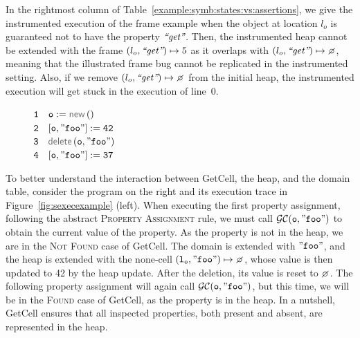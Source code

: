  
 
 In the rightmost column of Table~\ref{example:symb:states:vs:assertions}, we give the instrumented 
 execution of the frame example when
 the object at location $l_o$ is guaranteed not to have the property $\text{{\it ``get''}}$. 
 Then, the  instrumented heap cannot be extended  with 
 the frame $(l_o, \text{{\it ``get''}}) \mapsto 5$ as it overlaps with $(\loc_o, \litstring{get}) \mapsto \none$, meaning 
 that the illustrated frame bug cannot be replicated in the instrumented setting.  
 Also, if we remove $(\loc_o, \litstring{get}) \mapsto \none$ from the initial heap, 
 the instrumented execution will get stuck in the execution of line~$0$. 

\begin{figure}
\vspace*{-0.35cm}
{\small
\hspace*{-0.5cm} $\mathtt{1\quad o := \jsilnew ()}$ \\[-0.06cm]
\hspace*{-0.5cm} $\mathtt{2\quad [o, "foo"] := 42}$ \\[-0.06cm]
\hspace*{-0.5cm} $\mathtt{3\quad \jsildelete(o, "foo")}$ \\ [-0.06cm]
\hspace*{-0.5cm} $\mathtt{4\quad [o, "foo"] := 37}$ 
}
\vspace*{-0.4cm}
\end{figure}

To better understand the interaction between GetCell, the heap, and the domain table, consider the 
 program on the right and its execution trace in Figure~\ref{fig:sexecexample} (left). When executing the first property assignment, following the abstract \textsc{Property Assignment} rule, we must call $\mathcal{GC}(\mathtt{o, "foo"})$ to obtain the current value of the property. As the property is not in the heap, we are in the \textsc{Not Found} case of GetCell. The domain is extended with $\mathtt{"foo"}$, and the heap is extended with the none-cell $\mathtt{(\loc_o, "foo")} \mapsto \none$, whose value is then updated to 42 by the heap update. After the deletion, its value is reset to $\none$. The following property assignment will again call $\mathcal{GC}(\mathtt{o, "foo"})$, but this time, we will be in the \textsc{Found} case of GetCell, as the property is in the heap.
In a nutshell, GetCell ensures that all inspected properties, both present and absent, are represented in the heap.

